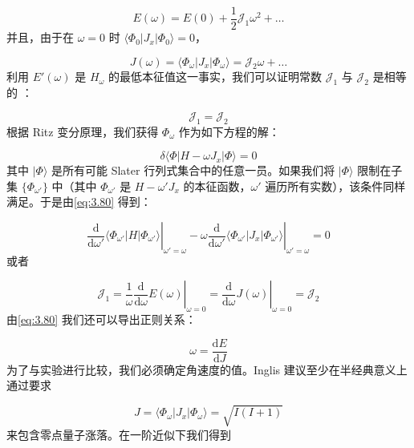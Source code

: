 \begin{equation}
E(\omega)=E(0)+\frac{1}{2}\mathcal{J}_{1}\omega^{2}+\dots\label{eq:3.77}
\end{equation}
并且，由于在 $\omega=0$ 时 $\langle\Phi_{0}|J_{x}|\Phi_{0}\rangle=0$，

\begin{equation}
J(\omega)=\langle\Phi_{\omega}|J_{x}|\Phi_{\omega}\rangle=\mathcal{J}_{2}\omega+\dots\label{eq:3.78}
\end{equation}
利用 $E'(\omega)$ 是 $H_{\omega}$ 的最低本征值这一事实，我们可以证明常数 $\mathcal{J}_{1}$
与 $\mathcal{J}_{2}$ 是相等的 \cite{Sch61}：

\begin{equation}
\mathcal{J}_{1}=\mathcal{J}_{2}\label{eq:3.79}
\end{equation}
根据 Ritz 变分原理，我们获得 $\Phi_{\omega}$ 作为如下方程的解：

\begin{equation}
\delta\langle\Phi|H-\omega J_{x}|\Phi\rangle=0\label{eq:3.80}
\end{equation}
其中 $|\Phi\rangle$ 是所有可能 Slater 行列式集合中的任意一员。如果我们将 $|\Phi\rangle$
限制在子集 $\{\Phi_{\omega'}\}$ 中（其中 $\Phi_{\omega'}$ 是 $H-\omega'J_{x}$
的本征函数，$\omega'$ 遍历所有实数），该条件同样满足。于是由\ref{eq:3.80} 得到：

\begin{equation}
\left.\frac{\mathrm{d}}{\mathrm{d}\omega'}\langle\Phi_{\omega'}|H|\Phi_{\omega'}\rangle\right|_{\omega'=\omega}-\omega\left.\frac{\mathrm{d}}{\mathrm{d}\omega'}\langle\Phi_{\omega'}|J_{x}|\Phi_{\omega'}\rangle\right|_{\omega'=\omega}=0\label{eq:3.81}
\end{equation}
或者

\[
\mathcal{J}_{1}=\left.\frac{1}{\omega}\frac{\mathrm{d}}{\mathrm{d}\omega}E(\omega)\right|_{\omega=0}=\left.\frac{\mathrm{d}}{\mathrm{d}\omega}J(\omega)\right|_{\omega=0}=\mathcal{J}_{2}
\]
由\ref{eq:3.80} 我们还可以导出正则关系：

\begin{equation}
\omega=\frac{\mathrm{d}E}{\mathrm{d}J}\label{eq:3.82}
\end{equation}
为了与实验进行比较，我们必须确定角速度的值。Inglis \cite{In54} 建议至少在半经典意义上通过要求

\begin{equation}
J=\langle\Phi_{\omega}|J_{x}|\Phi_{\omega}\rangle=\sqrt{I(I+1)}\label{eq:3.83}
\end{equation}
来包含零点量子涨落。在一阶近似下我们得到

